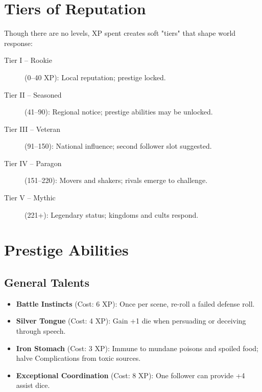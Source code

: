 \section{Tiers of Reputation}

Though there are no levels, XP spent creates soft "tiers" that shape world response:

\begin{description}
\item[Tier I -- Rookie] (0--40 XP): Local reputation; prestige locked.
\item[Tier II -- Seasoned] (41--90): Regional notice; prestige abilities may be unlocked.
\item[Tier III -- Veteran] (91--150): National influence; second follower slot suggested.
\item[Tier IV -- Paragon] (151--220): Movers and shakers; rivals emerge to challenge.
\item[Tier V -- Mythic] (221+): Legendary status; kingdoms and cults respond.
\end{description}

\section{Prestige Abilities}

\subsection{General Talents}
\begin{itemize}
    \item \textbf{Battle Instincts} (Cost: 6 XP): Once per scene, re-roll a failed defense roll.
    \item \textbf{Silver Tongue} (Cost: 4 XP): Gain +1 die when persuading or deceiving through speech.
    \item \textbf{Iron Stomach} (Cost: 3 XP): Immune to mundane poisons and spoiled food; halve Complications from toxic sources.
    \item \textbf{Exceptional Coordination} (Cost: 8 XP): One follower can provide +4 assist dice.
\end{itemize}

